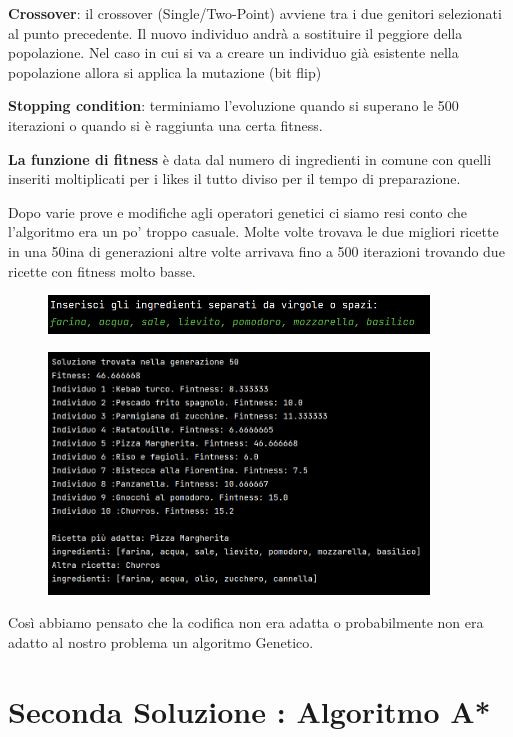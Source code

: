 \documentclass[12pt]{report}
\begin{document}
\textbf{Crossover}: il crossover (Single/Two-Point) avviene tra i due genitori selezionati al punto precedente. Il nuovo individuo andrà a sostituire il peggiore della popolazione. Nel caso in cui si va a creare un individuo già esistente nella popolazione allora si applica la mutazione (bit flip)

\textbf{Stopping condition}: terminiamo l’evoluzione quando si superano le 500 iterazioni o quando si è raggiunta una certa fitness.

\textbf{La funzione di fitness} è data dal numero di ingredienti in comune con quelli inseriti moltiplicati per i likes  il tutto diviso per il tempo di preparazione.

Dopo varie prove e modifiche agli operatori genetici ci siamo resi conto che l’algoritmo era un po' troppo casuale. Molte volte trovava le due migliori ricette in una 50ina di generazioni altre volte arrivava fino a 500 iterazioni trovando due ricette con fitness molto basse.

\begin{figure}[H]
        \centering
        {\includegraphics[width=0.9\textwidth]{img/img35.jpg}}
\end{figure}

\begin{figure}[H]
        \centering
        {\includegraphics[width=0.9\textwidth]{img/img34.jpg}}
\end{figure}

Così abbiamo pensato che la codifica non era adatta o probabilmente non era adatto al nostro problema un algoritmo Genetico.

\chapter{Seconda Soluzione : Algoritmo A*}
\end{document}
